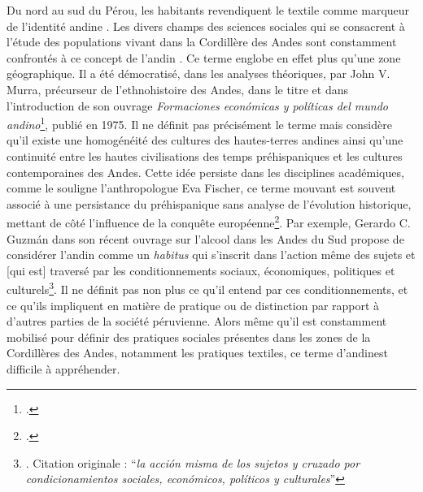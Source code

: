 Du nord au sud du Pérou, les habitants revendiquent le textile comme marqueur de l'identité \og andine \fg. 
Les divers champs des sciences sociales qui se consacrent à l'étude des populations vivant dans la Cordillère des Andes sont constamment confrontés à ce concept de \og l'andin \fg. Ce terme englobe en effet plus qu'une zone géographique. Il a  été démocratisé, dans les analyses théoriques,  par John V. Murra, précurseur de l'ethnohistoire des Andes, dans le titre et dans l'introduction de son ouvrage \textit{Formaciones económicas y políticas del mundo andino}\footcite[p.~22]{murraFormacionesEconomicasPoliticas1975}, publié en 1975. Il ne définit pas précisément le terme mais considère qu'il existe une homogénéité des cultures des hautes-terres andines ainsi qu'une continuité entre les hautes civilisations des temps préhispaniques et les cultures contemporaines des Andes. Cette idée persiste dans les disciplines académiques, comme le souligne l'anthropologue Eva Fischer, ce terme mouvant est souvent associé à une persistance du préhispanique sans analyse de l'évolution historique, mettant de côté l'influence de la conquête européenne\footcite[Partie 1, chapitre 1]{fischerUrdiendoTejidoSocial2008}. Par exemple, Gerardo C. Guzmán dans son récent ouvrage sur l'alcool dans les Andes du Sud propose de considérer \og l'andin \fg \:comme un \textit{habitus} qui s'inscrit dans \og l'action même des sujets et [qui est] traversé par les conditionnements sociaux, économiques, politiques et culturels\fg \footnote{\cite[p.~28]{castilloguzmanAlcoholAndinoEmbriaguez2015}. Citation originale : \textquotedblleft \textit{la acción misma de los sujetos y cruzado por condicionamientos sociales, económicos, políticos y culturales}\textquotedblright}. Il ne définit pas non plus ce qu'il entend par ces conditionnements, et ce qu'ils impliquent en matière de pratique ou de distinction par rapport à d'autres parties de la société péruvienne. Alors même qu'il est constamment mobilisé pour définir des pratiques sociales présentes dans les zones de la Cordillères des Andes, notamment les pratiques textiles, ce terme \og d'andin\fg \:est difficile à appréhender.

